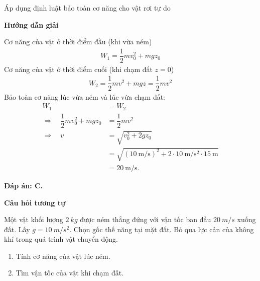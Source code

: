\begin{dang}{Áp dụng định luật bảo toàn cơ năng cho vật rơi tự do }
	{	\begin{center}
			\textbf{Hướng dẫn giải}
		\end{center}
		
		Cơ năng của vật ở thời điểm đầu (khi vừa ném)
		\begin{align*}
			W_1=\dfrac{1}{2}mv_0^2+mgz_0
		\end{align*}
		Cơ năng của vật ở thời điểm cuối (khi chạm đất $z=0$)
		\begin{align*}
			W_2=\dfrac{1}{2}mv^2+mgz=\dfrac{1}{2}mv^2
		\end{align*}
		Bảo toàn cơ năng lúc vừa ném và lúc vừa chạm đất:
		\begin{align*}
			W_1&=W_2\\
			\Rightarrow\quad	\dfrac{1}{2}mv_0^2+mgz_0&=\dfrac{1}{2}mv^2\\
			\Rightarrow\quad v&=\sqrt{v_0^2+2gz_0}\\
			&=\sqrt{(\SI{10}{\meter/\second})^2+2\cdot\SI{10}{\meter/\second^2}\cdot\SI{15}{\meter}}\\
			&=\SI{20}{\meter/\second}.
		\end{align*}
		
		\textbf{Đáp án: C.}
		
		\begin{center}
			\textbf{Câu hỏi tương tự}
		\end{center}
		
		Một vật khối lượng $\SI{2}{kg}$ được ném thẳng đứng với vận tốc ban đầu $\SI{20}{m/s}$ xuống đất. Lấy $g=\SI{10}{m/s^2}$. Chọn gốc thế năng tại mặt đất. Bỏ qua lực cản của không khí trong quá trình vật chuyển động.
		\begin{enumerate}[label=\alph*)]
			\item Tính cơ năng của vật lúc ném.
			\item Tìm vận tốc của vật khi chạm đất.
		\end{enumerate}
		
}
\end{dang}
